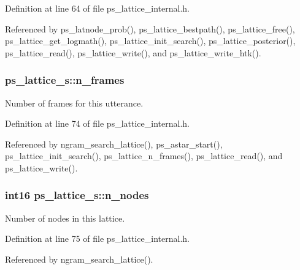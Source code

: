 Definition at line 64 of file ps\-\_\-lattice\-\_\-internal.\-h.



Referenced by ps\-\_\-latnode\-\_\-prob(), ps\-\_\-lattice\-\_\-bestpath(), ps\-\_\-lattice\-\_\-free(), ps\-\_\-lattice\-\_\-get\-\_\-logmath(), ps\-\_\-lattice\-\_\-init\-\_\-search(), ps\-\_\-lattice\-\_\-posterior(), ps\-\_\-lattice\-\_\-read(), ps\-\_\-lattice\-\_\-write(), and ps\-\_\-lattice\-\_\-write\-\_\-htk().

\subsubsection[{n\-\_\-frames}]{ ps\-\_\-lattice\-\_\-s\-::n\-\_\-frames}\label{structps__lattice__s_a3a997dc60d28b84d5bfc01f9ce25a891}


Number of frames for this utterance. 



Definition at line 74 of file ps\-\_\-lattice\-\_\-internal.\-h.



Referenced by ngram\-\_\-search\-\_\-lattice(), ps\-\_\-astar\-\_\-start(), ps\-\_\-lattice\-\_\-init\-\_\-search(), ps\-\_\-lattice\-\_\-n\-\_\-frames(), ps\-\_\-lattice\-\_\-read(), and ps\-\_\-lattice\-\_\-write().

\subsubsection[{n\-\_\-nodes}]{\setlength{\rightskip}{0pt plus 5cm}int16 ps\-\_\-lattice\-\_\-s\-::n\-\_\-nodes}\label{structps__lattice__s_ab3690a8d16e3fa8a3b0dd3aa8277b653}


Number of nodes in this lattice. 



Definition at line 75 of file ps\-\_\-lattice\-\_\-internal.\-h.



Referenced by ngram\-\_\-search\-\_\-lattice().

